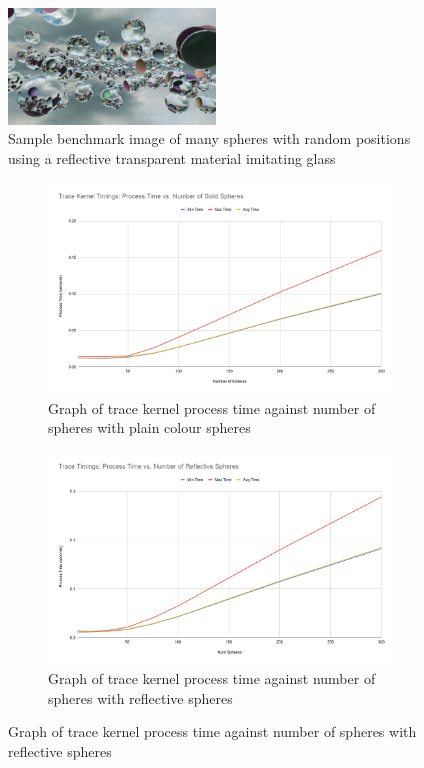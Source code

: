 \documentclass[final]{cmpreport}
\begin{document}
\begin{figure}
    \centering
    \includegraphics[width=0.49\textwidth]{img/benchmark_refract.png}
    \caption{Sample benchmark image of many spheres with random positions using a reflective transparent material imitating glass}
    \label{benchsphererefract}
\end{figure}

\begin{figure}
    \centering
    \begin{subfigure}{0.5\textwidth}
        \centering
        \includegraphics[width=\linewidth]{img/Trace Kernel Timings Number of Solid Spheres vs. Process Time.png}
        \caption{Graph of trace kernel process time against number of spheres with plain colour spheres}
        \label{graphsolidspheres}
    \end{subfigure}%
    \begin{subfigure}{0.5\textwidth}
        \centering
        \includegraphics[width=\linewidth]{img/Trace Timings Process Time vs. Number of Reflective Spheres.png}
        \caption{Graph of trace kernel process time against number of spheres with reflective spheres}
        \label{graphreflectspheres}
    \end{subfigure}
\end{figure}
\end{document}
